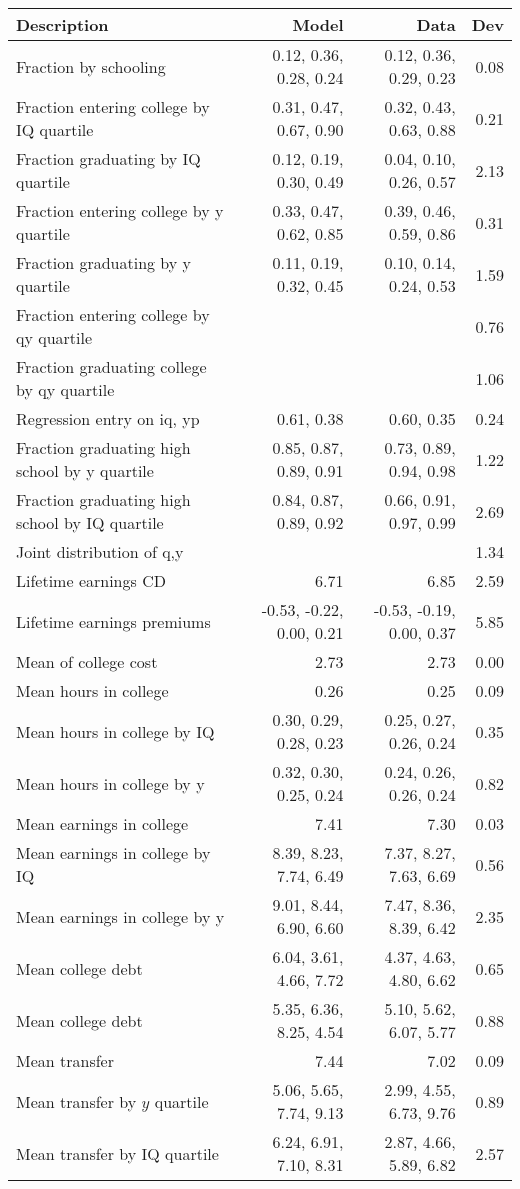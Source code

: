 \begin{tabular}{lrrr}
\hline
Description & Model  & Data  & Dev  \\ 
\hline
Fraction by schooling & 0.12, 0.36, 0.28, 0.24  & 0.12, 0.36, 0.29, 0.23  & 0.08  \\ 
Fraction entering college by IQ quartile & 0.31, 0.47, 0.67, 0.90  & 0.32, 0.43, 0.63, 0.88  & 0.21  \\ 
Fraction graduating by IQ quartile & 0.12, 0.19, 0.30, 0.49  & 0.04, 0.10, 0.26, 0.57  & 2.13  \\ 
Fraction entering college by y quartile & 0.33, 0.47, 0.62, 0.85  & 0.39, 0.46, 0.59, 0.86  & 0.31  \\ 
Fraction graduating by y quartile & 0.11, 0.19, 0.32, 0.45  & 0.10, 0.14, 0.24, 0.53  & 1.59  \\ 
Fraction entering college by qy quartile &   &   & 0.76  \\ 
Fraction graduating college by qy quartile &   &   & 1.06  \\ 
Regression entry on iq, yp & 0.61, 0.38  & 0.60, 0.35  & 0.24  \\ 
Fraction graduating high school by y quartile & 0.85, 0.87, 0.89, 0.91  & 0.73, 0.89, 0.94, 0.98  & 1.22  \\ 
Fraction graduating high school by IQ quartile & 0.84, 0.87, 0.89, 0.92  & 0.66, 0.91, 0.97, 0.99  & 2.69  \\ 
Joint distribution of q,y &   &   & 1.34  \\ 
Lifetime earnings CD & 6.71  & 6.85  & 2.59  \\ 
Lifetime earnings premiums & -0.53, -0.22, 0.00, 0.21  & -0.53, -0.19, 0.00, 0.37  & 5.85  \\ 
Mean of college cost & 2.73  & 2.73  & 0.00  \\ 
Mean hours in college & 0.26  & 0.25  & 0.09  \\ 
Mean hours in college by IQ & 0.30, 0.29, 0.28, 0.23  & 0.25, 0.27, 0.26, 0.24  & 0.35  \\ 
Mean hours in college by y & 0.32, 0.30, 0.25, 0.24  & 0.24, 0.26, 0.26, 0.24  & 0.82  \\ 
Mean earnings in college & 7.41  & 7.30  & 0.03  \\ 
Mean earnings in college by IQ & 8.39, 8.23, 7.74, 6.49  & 7.37, 8.27, 7.63, 6.69  & 0.56  \\ 
Mean earnings in college by y & 9.01, 8.44, 6.90, 6.60  & 7.47, 8.36, 8.39, 6.42  & 2.35  \\ 
Mean college debt & 6.04, 3.61, 4.66, 7.72  & 4.37, 4.63, 4.80, 6.62  & 0.65  \\ 
Mean college debt & 5.35, 6.36, 8.25, 4.54  & 5.10, 5.62, 6.07, 5.77  & 0.88  \\ 
Mean transfer & 7.44  & 7.02  & 0.09  \\ 
Mean transfer by $y$ quartile & 5.06, 5.65, 7.74, 9.13  & 2.99, 4.55, 6.73, 9.76  & 0.89  \\ 
Mean transfer by IQ quartile & 6.24, 6.91, 7.10, 8.31  & 2.87, 4.66, 5.89, 6.82  & 2.57  \\ 
\hline
\end{tabular}%
